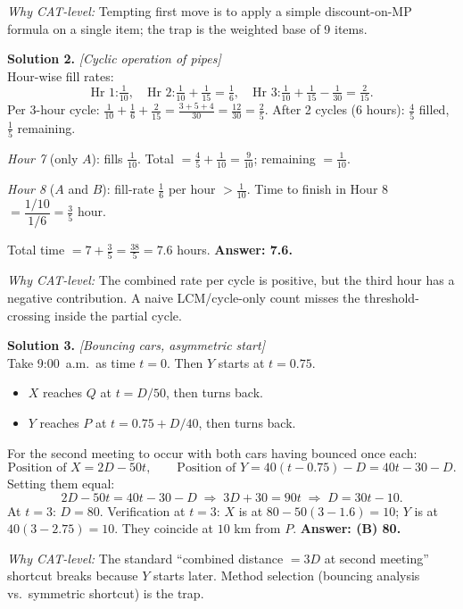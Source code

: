 \documentclass[11pt,a4paper]{article}
\begin{document}
\textit{Why CAT-level:} Tempting first move is to apply a simple discount-on-MP formula on a single item; the trap is the weighted base of 9 items.

\vspace{4pt}
\textbf{Solution 2.} \textit{[Cyclic operation of pipes]}\\
Hour-wise fill rates:
\[
\text{Hr 1:} \tfrac{1}{10},\quad \text{Hr 2:} \tfrac{1}{10}+\tfrac{1}{15}=\tfrac{1}{6},\quad \text{Hr 3:} \tfrac{1}{10}+\tfrac{1}{15}-\tfrac{1}{30}=\tfrac{2}{15}.
\]
Per 3-hour cycle: $\tfrac{1}{10}+\tfrac{1}{6}+\tfrac{2}{15} = \tfrac{3+5+4}{30} = \tfrac{12}{30} = \tfrac{2}{5}$.
After 2 cycles (6 hours): $\tfrac{4}{5}$ filled, $\tfrac{1}{5}$ remaining.

\textit{Hour 7} (only $A$): fills $\tfrac{1}{10}$. Total $= \tfrac{4}{5}+\tfrac{1}{10}=\tfrac{9}{10}$; remaining $= \tfrac{1}{10}$.

\textit{Hour 8} ($A$ and $B$): fill-rate $\tfrac{1}{6}$ per hour $> \tfrac{1}{10}$. Time to finish in Hour 8 $= \dfrac{1/10}{1/6} = \tfrac{3}{5}$ hour.

Total time $= 7 + \tfrac{3}{5} = \tfrac{38}{5} = 7.6$ hours.
\textbf{Answer: 7.6.}

\textit{Why CAT-level:} The combined rate per cycle is positive, but the third hour has a negative contribution. A naive LCM/cycle-only count misses the threshold-crossing inside the partial cycle.

\vspace{4pt}
\textbf{Solution 3.} \textit{[Bouncing cars, asymmetric start]}\\
Take 9:00~a.m.\ as time $t=0$. Then $Y$ starts at $t=0.75$.
\begin{itemize}[leftmargin=*]
  \item $X$ reaches $Q$ at $t = D/50$, then turns back.
  \item $Y$ reaches $P$ at $t = 0.75 + D/40$, then turns back.
\end{itemize}
For the second meeting to occur with both cars having bounced once each:
\[
\text{Position of } X = 2D - 50t,\qquad \text{Position of } Y = 40(t - 0.75) - D = 40t - 30 - D.
\]
Setting them equal:
\[
2D - 50t = 40t - 30 - D \;\Longrightarrow\; 3D + 30 = 90t \;\Longrightarrow\; D = 30t - 10.
\]
At $t=3$: $D = 80$.
Verification at $t=3$: $X$ is at $80 - 50(3-1.6) = 10$; $Y$ is at $40(3-2.75) = 10$. They coincide at $10$ km from $P$.
\textbf{Answer: (B) 80.}

\textit{Why CAT-level:} The standard ``combined distance $= 3D$ at second meeting'' shortcut breaks because $Y$ starts later. Method selection (bouncing analysis vs.\ symmetric shortcut) is the trap.
\end{document}
